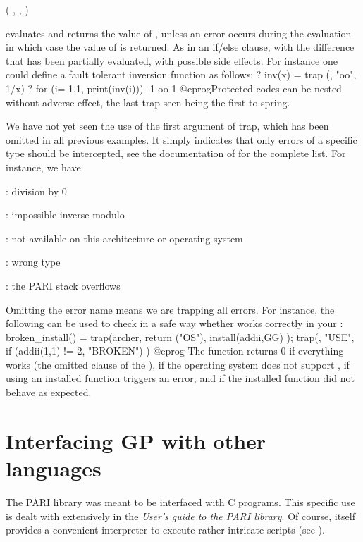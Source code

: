   ( , , )

\noindent evaluates and returns the value of , unless an
error occurs during the evaluation in which case the value of 
is returned. As in an if/else clause, with the difference that
 has been partially evaluated, with possible side effects.
For instance one could define a fault tolerant inversion function as follows:
\bprog
? inv(x) = trap (, "oo", 1/x)
? for (i=-1,1, print(inv(i)))
-1
oo
1
@eprog\noindent Protected codes can be nested without adverse effect, the
last trap seen being the first to spring.

 We have not yet seen the use of the
first argument of trap, which has been omitted in all previous examples. It
simply indicates that only errors of a specific type should be intercepted,
see the documentation of  for the complete list. For instance, we
have

: division by 0

: impossible inverse modulo

: not available on this architecture or operating system

: wrong type

: the PARI stack overflows

\noindent Omitting the error name means we are trapping all errors. For
instance, the following can be used to check in a safe way whether
 works correctly in your :
\bprog
broken_install() =
{
  trap(archer, return ("OS"),
    install(addii,GG)
  );
  trap(, "USE",
    if (addii(1,1) != 2, "BROKEN")
  )
}
@eprog
\noindent The function returns 0 if everything works (the omitted 
clause of the ),  if the operating system does not support
,  if using an installed function triggers an error,
and  if the installed function did not behave as expected.

\section{Interfacing GP with other languages}
\noindent
The PARI library was meant to be interfaced with C programs. This specific
use is dealt with extensively in the \emph{User's guide to the PARI library}.
Of course,  itself provides a convenient  interpreter to execute
rather intricate scripts (see ).

